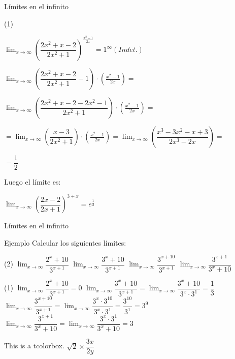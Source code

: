 \documentclass[8pt]{beamer}
\newcommand{\limite}[2]{\displaystyle \lim_{x \rightarrow #1}{#2}}
\begin{document}
\begin{frame}{Límites en el infinito}
\begin{tasks}[label=\alph*),resume](1)

\task $\limite{\infty}{\left( \dfrac{2x^2+x-2}{2x^2+1}\right)^{\frac{x^2-1}{2x}}}=1^{\infty} (Indet.)$

\vspace{10pt}


$\limite{\infty}{\left( \dfrac{2x^2+x-2}{2x^2+1}-1\right)\cdot \left( \frac{x^2-1}{2x} \right)}= $
\vspace{10pt}


$\limite{\infty}{\left( \dfrac{2x^2+x-2-2x^2-1}{2x^2+1}\right)\cdot\left( \frac{x^2-1}{2x} \right)}= $

\vspace{10pt}

$= \limite{\infty}{\left( \dfrac{x-3}{2x^2+1}\right)\cdot\left( \frac{x^2-1}{2x} \right)}=
\limite{\infty}{\left( \dfrac{x^3-3x^2-x+3}{2x^3-2x}\right)}= $

\vspace{10pt}

$=\dfrac{1}{2}$

\vspace{10pt}

Luego el límite es: 

\vspace{10pt}
$\limite{\infty}{\left( \dfrac{2x-2}{2x+1}\right)^{3+x}}= e^{\frac{1}{2}}$


\end{tasks}
\end{frame}

\begin{frame}{Límites en el infinito}
\begin{exampleblock}{Ejemplo}
Calcular los siguientes límites:
\begin{tasks}[label=\alph*)](2)
\task $\limite{\infty}{\dfrac{2^x+10}{3^{x+1}}}$
\task $\limite{\infty}{\dfrac{3^x+10}{3^{x+1}}}$
\task $\limite{\infty}{\dfrac{3^{x+10}}{3^{x+1}}}$
\task $\limite{\infty}{\dfrac{3^{x+1}}{3^x+10}}$

\end{tasks}
\end{exampleblock}

\begin{tasks}[label=\alph*)](1)
\task $\limite{\infty}{\dfrac{2^x+10}{3^{x+1}}}= 0$
\task $\limite{\infty}{\dfrac{3^x+10}{3^{x+1}}}= \limite{\infty}{\dfrac{3^x+10}{3^x\cdot 3^1}}= \dfrac{1}{3} $
\task $\limite{\infty}{\dfrac{3^{x+10}}{3^{x+1}}}= \limite{\infty}{\dfrac{3^x\cdot 3^{10}}{3^x\cdot 3^1}}= \dfrac{3^{10}}{3^1}= 3^9$
\task $\limite{\infty}{\dfrac{3^{x+1}}{3^x+10}}= \limite{\infty}{\dfrac{3^x\cdot 3^1}{3^x+10}}= 3$

\end{tasks}

\end{frame}

\begin{frame}
\begin{tcolorbox}[enhanced,size=small,sharp corners,
colframe=red,interior hidden,colupper=black,fontupper=\bfseries]
This is a tcolorbox. $ \sqrt{2} \times \dfrac{3x}{2y}$
\end{tcolorbox}
\end{frame}
\end{document}
